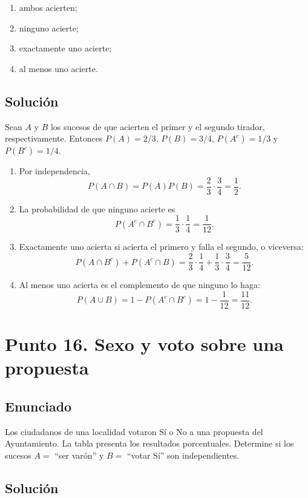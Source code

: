 \documentclass[12pt]{article}
\begin{document}
\begin{enumerate}
    \item ambos acierten;
    \item ninguno acierte;
    \item exactamente uno acierte;
    \item al menos uno acierte.
\end{enumerate}

\subsection*{Solución}

Sean $A$ y $B$ los sucesos de que acierten el primer y el segundo tirador, respectivamente. Entonces $P(A)=2/3$, $P(B)=3/4$, $P(A^c)=1/3$ y $P(B^c)=1/4$.

\begin{enumerate}
    \item Por independencia,
    \[
    P(A\cap B)=P(A)P(B)=\frac{2}{3}\cdot\frac{3}{4}=\frac{1}{2}.
    \]
    \item La probabilidad de que ninguno acierte es
    \[
    P(A^c\cap B^c)=\frac{1}{3}\cdot\frac{1}{4}=\frac{1}{12}.
    \]
    \item Exactamente uno acierta si acierta el primero y falla el segundo, o viceversa:
    \[
    P(A\cap B^c)+P(A^c\cap B)
    =\frac{2}{3}\cdot\frac{1}{4}+\frac{1}{3}\cdot\frac{3}{4}
    =\frac{5}{12}.
    \]
    \item Al menos uno acierta es el complemento de que ninguno lo haga:
    \[
    P(A\cup B)=1-P(A^c\cap B^c)=1-\frac{1}{12}=\frac{11}{12}.
    \]
\end{enumerate}

\section*{Punto 16. Sexo y voto sobre una propuesta}

\subsection*{Enunciado}

Los ciudadanos de una localidad votaron Sí o No a una propuesta del Ayuntamiento. La tabla presenta los resultados porcentuales. Determine si los sucesos $A=$ ``ser varón'' y $B=$ ``votar Sí'' son independientes.

\subsection*{Solución}
\end{document}
